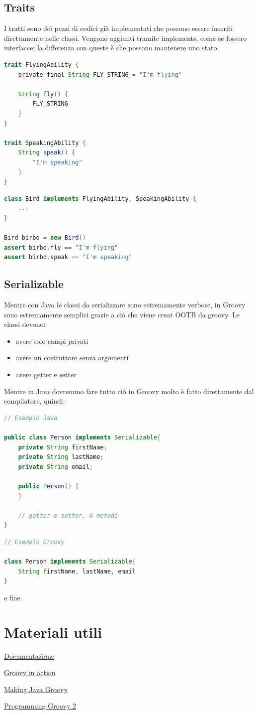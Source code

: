 \documentclass[11pt,a4paper]{book}
\begin{document}
\section{Traits}
I tratti sono dei pezzi di codici già implementati che possono essere inseriti direttamente nelle classi. Vengono aggiunti tramite implements, come se fossero interfacce; la differenza con queste è che possono mantenere uno stato.
\begin{lstlisting}[language = groovy]
trait FlyingAbility {
	private final String FLY_STRING = "I'm flying"	
	
	String fly() {
		FLY_STRING
	}
}

trait SpeakingAbility {
	String speak() {
		"I'm speaking"
	}
}
\end{lstlisting}
\begin{lstlisting}[language = groovy]
class Bird implements FlyingAbility, SpeakingAbility {
	...
}

Bird birbo = new Bird()
assert birbo.fly == "I'm flying"
assert birbo.speak == "I'm speaking"
\end{lstlisting}

\section{Serializable}
Mentre con Java le classi da serializzare sono estremamente verbose, in Groovy sono estremamente semplici grazie a ciò che viene creat OOTB da groovy. Le classi devono:
\begin{itemize}
	\item avere solo campi privati
	\item avere un costruttore senza argomenti
	\item avere getter e setter
\end{itemize}

Mentre in Java dovremmo fare tutto ciò in Groovy molto è fatto direttamente dal compilatore, quindi:
\begin{lstlisting}[language = java]
// Esempio Java

public class Person implements Serializable{
	private String firstName;
	private String lastName;
	private String email;
	
	public Person() {
	}
	
	// getter e setter, 6 metodi
}
\end{lstlisting}
\begin{lstlisting}[language = groovy]
// Esempio Groovy

class Person implements Serializable{
	String firstName, lastName, email
}
\end{lstlisting}
e fine.

\chapter{Materiali utili}
\href{https://groovy-lang.org/}{Documentazione}

\href{https://www.manning.com/books/groovy-in-action-second-edition}{Groovy in action}

\href{https://www.manning.com/books/making-java-groovy}{Making Java Groovy}

\href{https://pragprog.com/titles/vslg2/programming-groovy-2/}{Programming Groovy 2}
\end{document}
